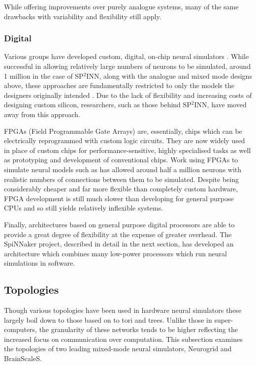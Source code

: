 				While offering improvements over purely analogue systems, many of the same
				drawbacks with variability and flexibility still apply.
			
			\subsubsection{Digital}
				
				Various groups have developed custom, digital, on-chip neural simulators
				\cite{prange93,jahnke96,schoenauer99,mehrtash03}. While successful in
				allowing relatively large numbers of neurons to be simulated, around 1
				million in the case of SP$^2$INN, along with the analogue and mixed mode
				designs above, these approaches are fundamentally restricted to only the
				models the designers originally intended \cite{mehrtash03}. Due to the
				lack of flexibility and increasing costs of designing custom silicon,
				researchers, such as those behind SP$^2$INN, have moved away from this
				approach.
				
				FPGAs (Field Programmable Gate Arrays) are, essentially, chips which can
				be electrically reprogrammed with custom logic circuits. They are now
				widely used in place of custom chips for performance-sensitive, highly
				specialised tasks as well as prototyping and development of conventional
				chips. Work using FPGAs to simulate neural models such as
				\cite{hellmich05} has allowed around half a million neurons with realistic
				numbers of connections between them to be simulated. Despite being
				considerably cheaper and far more flexible than completely custom
				hardware, FPGA development is still much slower than developing for
				general purpose CPUs and so still yields relatively inflexible systems.
				
				Finally, architectures based on general purpose digital processors are
				able to provide a great degree of flexibility at the expense of greater
				overhead\cite{furber07}. The SpiNNaker project, described in detail in the
				next section, has developed an architecture which combines many low-power
				processors which run neural simulations in software.
		
		\subsection{Topologies}
			
			Though various topologies have been used in hardware neural simulators
			these largely boil down to those based on to tori and trees. Unlike those
			in super-computers, the granularity of these networks tends to be higher
			reflecting the increased focus on communication over computation.  This
			subsection examines the topologies of two leading mixed-mode neural
			simulators, Neurogrid and BrainScaleS.
			
